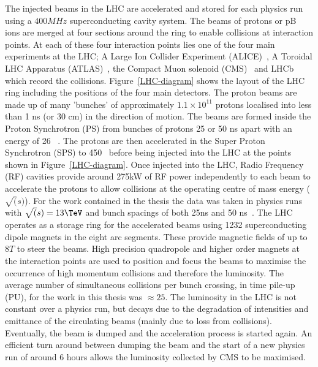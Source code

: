 The injected beams in the LHC are accelerated and stored for each physics run using 
a $400MHz$ superconducting cavity system. The beams of protons or pB ions 
are merged at four sections around the ring to enable collisions at interaction points.
At each of these four interaction points lies one of the four main 
experiments at the LHC; A Large Ion Collider Experiment (ALICE)~\cite{ALICE},
A Toroidal LHC Apparatus (ATLAS)~\cite{ATLAS}, the Compact Muon solenoid (CMS)~\cite{CMS}
and LHCb which record the collisions. Figure~\ref{LHC-diagram} shows the layout of the LHC ring including
the positions of the four main detectors. The proton beams are made up of many 'bunches' of approximately $1.1\times10^{11}$
protons localised into less than 1 ns (or 30 cm) in the direction of motion.
The beams are formed inside the Proton Synchrotron (PS) from bunches of protons 25 or 50 ns apart with an energy of 26 \GeV~. 
The protons are then accelerated in the Super Proton Synchrotron (SPS) to 450 \GeV~before being injected into the LHC at
the points shown in Figure~\ref{LHC-diagram}. Once injected into the LHC, Radio Frequency (RF) cavities 
provide around 275kW of RF power independently to each beam to accelerate the protons to allow collisions
at the operating centre of mass energy ($\sqrt(s)$). For the work contained in the thesis 
the data was taken in physics runs with $\sqrt(s) = 13\TeV$ and bunch spacings of both 25ns and 50 ns~\cite{LHC}. 
The LHC operates as a storage ring for the accelerated beams using 1232 
superconducting dipole magnets in the eight arc segments. These provide magnetic fields of up to $8T$ to steer the beams. 
High precision quadropole and higher order magnets at the interaction points are used to position and focus the beams to 
maximise the occurrence of high momentum collisions and therefore the luminosity. The average number of simultaneous collisions
per bunch crossing, in time pile-up (PU), for the work in this thesis was $\approx25$.
The luminosity in the LHC is not constant over a physics run, but decays due to the degradation 
of intensities and emittance of the circulating beams (mainly due to loss from collisions). Eventually,
the beam is dumped and the acceleration process is started again. An efficient turn around between
dumping the beam and the start of a new physics run of 
around 6 hours allows the luminosity collected by CMS to be maximised. 

